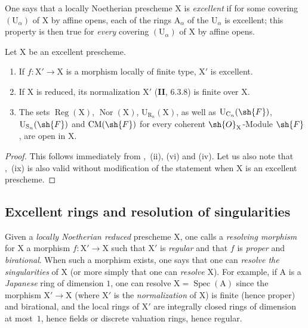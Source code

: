 \begin{env}[7.8.5]
\label{IV.7.8.5}
One says that a locally Noetherian prescheme $\mathrm{X}$ is \emph{excellent} if for some covering $(\mathrm{U}_\alpha)$ of $\mathrm{X}$ by affine opens, each of the rings $\mathrm{A}_\alpha$ of the $\mathrm{U}_\alpha$ is excellent; this property is then true for \emph{every} covering $(\mathrm{U}_\alpha)$ of $\mathrm{X}$ by affine opens.
\end{env}

\begin{proposition}[7.8.6]
\label{IV.7.8.6}
Let $\mathrm{X}$ be an excellent prescheme.
\begin{enumerate}[label=(\roman*)]
  \item If $f:\mathrm{X}'\to\mathrm{X}$ is a morphism locally of finite type, $\mathrm{X}'$ is excellent.


  \item If $\mathrm{X}$ is reduced, its normalization $\mathrm{X}'$ (\textbf{II}, $6.3.8$) is finite over $\mathrm{X}$.
  \item The sets $\operatorname{Reg}(\mathrm{X})$, $\operatorname{Nor}(\mathrm{X})$, $\mathrm{U}_{\mathrm{R}_n}(\mathrm{X})$, as well as $\mathrm{U}_{\mathrm{C}_n}(\sh{F})$, $\mathrm{U}_{\mathrm{S}_n}(\sh{F})$ and $\mathrm{CM}(\sh{F})$ for every coherent $\sh{O}_\mathrm{X}$-Module $\sh{F}$, are open in $\mathrm{X}$.
\end{enumerate}
\end{proposition}

\begin{proof}
This follows immediately from ,~(ii), (vi) and (iv). Let us also note that ,~(ix) is also valid without modification of the statement when $\mathrm{X}$ is an excellent prescheme.
\end{proof}


\subsection{Excellent rings and resolution of singularities}
\label{subsection:IV.7.9}

\begin{env}[7.9.1]
\label{IV.7.9.1}
Given a \emph{locally Noetherian reduced} prescheme $\mathrm{X}$, one calls a \emph{resolving morphism} for $\mathrm{X}$ a morphism $f:\mathrm{X}'\to\mathrm{X}$ such that $\mathrm{X}'$ is \emph{regular} and that $f$ is \emph{proper} and \emph{birational}. When such a morphism exists, one says that one can \emph{resolve the singularities} of $\mathrm{X}$ (or more simply that one can \emph{resolve} $\mathrm{X}$). For example, if $\mathrm{A}$ is a \emph{Japanese} ring of dimension $1$, one can resolve $\mathrm{X}=\operatorname{Spec}(\mathrm{A})$ since the morphism $\mathrm{X}'\to\mathrm{X}$ (where $\mathrm{X}'$ is the \emph{normalization} of $\mathrm{X}$) is finite (hence proper) and birational, and the local rings of $\mathrm{X}'$ are integrally closed rings of dimension at most~$1$, hence fields or discrete valuation rings, hence regular.
\end{env}


